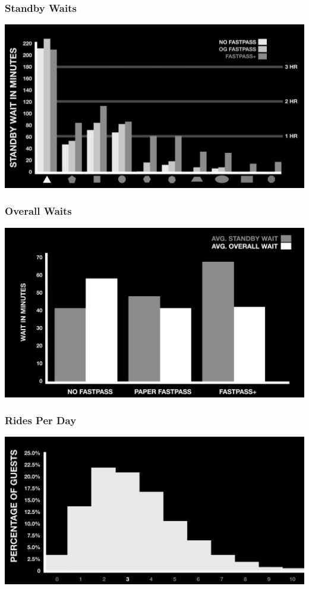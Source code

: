 \begin{frame}
\frametitle{Standby Waits}

\begin{center}
	\includegraphics[width=\textwidth]{images/standbywait.png}
\end{center}

\end{frame}


\begin{frame}
\frametitle{Overall Waits}

\begin{center}
	\includegraphics[width=\textwidth]{images/overallwait.png}
\end{center}

\end{frame}


\begin{frame}
\frametitle{Rides Per Day}

\begin{center}
	\includegraphics[width=\textwidth]{images/ridesperday.png}
\end{center}

\end{frame}


